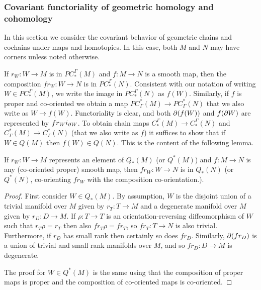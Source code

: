 \subsubsection{Covariant functoriality of geometric homology and cohomology}\label{S: covariant functoriality}

In this section we consider the covariant behavior of geometric chains and cochains under maps and homotopies.
In this case, both $M$ and $N$ may have corners unless noted otherwise.

If $r_W \colon W \to M$ is in $PC_*^\Gamma(M)$ and $f \colon M \to N$ is a smooth map, then the composition $fr_W \colon W \to N$ is in $PC^\Gamma_*(N)$.
Consistent with our notation of writing $W \in PC_*^\Gamma(M)$, we write the image in $PC_*^\Gamma(N)$ as $f(W)$.
Similarly, if $f$ is proper and co-oriented we obtain a map $PC^*_\Gamma(M) \to PC^*_\Gamma(N)$ that we also write as $W \to f(W)$.
Functoriality is clear, and both $\partial(f(W))$ and $f(\partial W)$ are represented by $fr_Wi_{\partial W}$.
To obtain chain maps $C_*^\Gamma(M) \to C_*^\Gamma(N)$ and $C^*_\Gamma(M) \to C^*_\Gamma(N)$
(that we also write as $f$) it suffices to show that if $W \in Q(M)$ then $f(W) \in Q(N)$.
This is the content of the following lemma.

\begin{lemma}\label{L: Q preservation}
	If $r_W \colon W \to M$ represents an element of $Q_*(M)$ (or $Q^*(M)$) and $f \colon M \to N$ is any (co-oriented proper) smooth map, then $fr_W \colon W \to N$ is in $Q_*(N)$ (or $Q^*(N)$, co-orienting $fr_W$ with the composition co-orientation.).
\end{lemma}

\begin{proof}
	First consider $W \in Q_*(M)$.
	By assumption, $W$ is the disjoint union of a trivial manifold over $M$ given by $r_T \colon T \to M$ and a degenerate manifold over $M$ given by $r_D:D \to M$.
	If $\rho \colon T \to T$ is an orientation-reversing diffeomorphism of $W$ such that $r_T\rho = r_T$ then also $fr_T\rho = fr_T$, so $fr_T \colon T \to N$ is also trivial.
	Furthermore, if $r_D$ has small rank then certainly so does $fr_D$.
	Similarly, $\partial(fr_D)$ is a union of trivial and small rank manifolds over $M$, and so $fr_D:D \to M$ is degenerate.

	The proof for $W \in Q^*(M)$ is the same using that the composition of proper maps is proper and the composition of co-oriented maps is co-oriented.
\end{proof}

